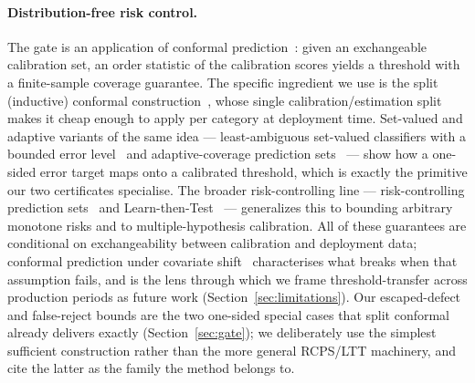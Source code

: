 \documentclass[preprint,11pt]{elsarticle}
\begin{document}
\paragraph{Distribution-free risk control.} The gate is an application of conformal
prediction~\citep{vovk2005algorithmic,lei2018distribution,angelopoulos2023gentle}: given an
exchangeable calibration set, an order statistic of the calibration scores yields a threshold with
a finite-sample coverage guarantee. The specific ingredient we use is the split (inductive)
conformal construction~\citep{papadopoulos2002inductive}, whose single calibration/estimation split
makes it cheap enough to apply per category at deployment time. Set-valued and adaptive variants of
the same idea --- least-ambiguous set-valued classifiers with a bounded error
level~\citep{sadinle2019least} and adaptive-coverage prediction
sets~\citep{romano2020aps} --- show how a one-sided error target maps onto a calibrated threshold,
which is exactly the primitive our two certificates specialise. The broader risk-controlling line
--- risk-controlling prediction sets~\citep{bates2021rcps} and
Learn-then-Test~\citep{angelopoulos2021ltt} --- generalizes this to bounding arbitrary monotone
risks and to multiple-hypothesis calibration. All of these guarantees are conditional on
exchangeability between calibration and deployment data; conformal prediction under covariate
shift~\citep{tibshirani2019covariate} characterises what breaks when that assumption fails, and is
the lens through which we frame threshold-transfer across production periods as future work
(Section~\ref{sec:limitations}). Our escaped-defect and false-reject bounds are the two one-sided
special cases that split conformal already delivers exactly (Section~\ref{sec:gate}); we
deliberately use the simplest sufficient construction rather than the more general RCPS/LTT
machinery, and cite the latter as the family the method belongs to.
\end{document}
